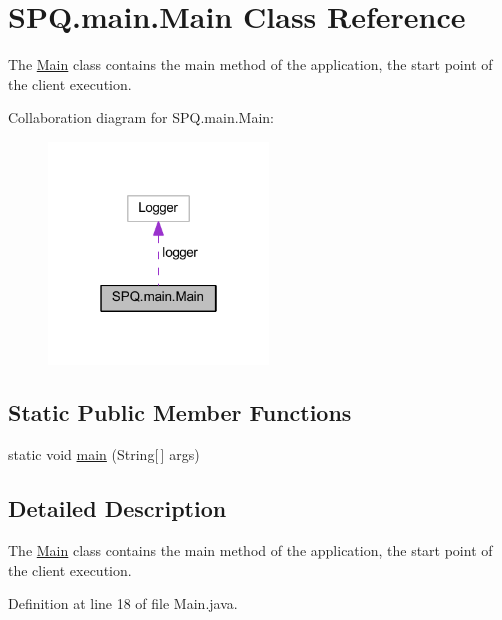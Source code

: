 \hypertarget{class_s_p_q_1_1main_1_1_main}{}\section{S\+P\+Q.\+main.\+Main Class Reference}
\label{class_s_p_q_1_1main_1_1_main}


The \mbox{\hyperlink{class_s_p_q_1_1main_1_1_main}{Main}} class contains the main method of the application, the start point of the client execution.  




Collaboration diagram for S\+P\+Q.\+main.\+Main\+:\nopagebreak
\begin{figure}[H]
\begin{center}
\leavevmode
\includegraphics[width=166pt]{class_s_p_q_1_1main_1_1_main__coll__graph}
\end{center}
\end{figure}
\subsection*{Static Public Member Functions}
\begin{DoxyCompactItemize}
\item 
static void \mbox{\hyperlink{class_s_p_q_1_1main_1_1_main_ac7d2350f6924287c711b7e2bf1c430fa}{main}} (String\mbox{[}$\,$\mbox{]} args)
\end{DoxyCompactItemize}


\subsection{Detailed Description}
The \mbox{\hyperlink{class_s_p_q_1_1main_1_1_main}{Main}} class contains the main method of the application, the start point of the client execution. 

Definition at line 18 of file Main.\+java.




